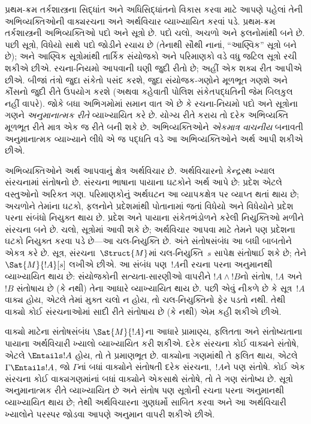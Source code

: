 પ્રથમ-ક્રમ તર્કશાસ્ત્રના સિદ્ધાંત અને
અધિસિદ્ધાંતનો વિકાસ કરવા માટે આપણે
પહેલાં તેની અભિવ્યક્તિઓની વાક્યરચના
અને અર્થવિચાર વ્યાખ્યાયિત કરવાં પડે.
પ્રથમ-ક્રમ તર્કશાસ્ત્રની અભિવ્યક્તિઓ
પદો અને સૂત્રો છે. પદો
ચલો, અચળો અને
ફલનોમાંથી બને છે.
પછી સૂત્રો, વિધેયો
સાથે પદો જોડીને રચાય છે
(તેનાથી સૌથી નાનાં, “આણ્વિક”
સૂત્રો બને છે); અને આણ્વિક
સૂત્રોમાંથી તાર્કિક સંયોજકો
અને પરિમાણકો વડે વધુ જટિલ
સૂત્રો રચી શકીએ છીએ.
રચના-નિયમો આપવાની ઘણી જુદી
રીતો છે; અહીં એક શક્ય
રીત આપીએ છીએ. બીજાં તંત્રો
જુદા સંકેતો પસંદ કરશે,
જુદા સંયોજક-ગણોને મૂળભૂત
ગણશે અને કૌંસનો જુદી
રીતે ઉપયોગ કરશે
(અથવા કહેવાતી પોલિશ
સંકેતપદ્ધતિની જેમ બિલકુલ
નહીં વાપરે). જોકે બધા
અભિગમોમાં સમાન વાત
એ છે કે રચના-નિયમો
પદો અને સૂત્રોના ગણને
\emph{અનુમાનાત્મક રીતે}
વ્યાખ્યાયિત કરે છે.
યોગ્ય રીતે કરાય તો
દરેક અભિવ્યક્તિ મૂળભૂત
રીતે માત્ર એક જ રીતે
બની શકે છે. અભિવ્યક્તિઓને
\emph{એકમાત્ર વાચનીય}
બનાવતી અનુમાનાત્મક
વ્યાખ્યાને લીધે એ જ
પદ્ધતિ વડે આ
અભિવ્યક્તિઓને અર્થ
આપી શકીએ છીએ.

અભિવ્યક્તિઓને અર્થ આપવાનું ક્ષેત્ર
અર્થવિચાર છે. અર્થવિચારનો કેન્દ્રસ્થ
ખ્યાલ સંરચનામાં સંતોષનો છે.
સંરચના ભાષાના પાયાના
ઘટકોને અર્થ આપે છે:
પ્રદેશ એટલે વસ્તુઓનો
અરિક્ત ગણ. પરિમાણકોનું
અર્થઘટન આ વ્યાપકક્ષેત્ર
પર વ્યાપ્ત થતાં થાય છે;
અચળોને તેમાંના ઘટકો,
ફલનોને પ્રદેશમાંથી
પોતાનામાં જતાં વિધેયો અને
વિધેયોને પ્રદેશ
પરના સંબંધો નિયુક્ત થાય છે.
પ્રદેશ અને પાયાના
સંકેતભંડોળને કરેલી નિયુક્તિઓ
મળીને સંરચના બને છે.
ચલો, સૂત્રોમાં
આવી શકે છે; અર્થવિચાર
આપવા માટે તેમને પણ
પ્રદેશના ઘટકો
નિયુક્ત કરવા પડે છે—આ
ચલ-નિયુક્તિ છે. અંતે
સંતોષસંબંધ આ બધી બાબતોને
એકત્ર કરે છે. સૂત્ર,
સંરચના~$\Struct{M}$માં
ચલ-નિયુક્તિ~$s$ સાપેક્ષ
સંતોષાઈ શકે છે; તેને
$\Sat{M}{!A}[s]$ લખીએ છીએ.
આ સંબંધ પણ~$!A$ની
રચના પરના અનુમાનથી
વ્યાખ્યાયિત થાય છે:
સંયોજકોની સત્યતા-સારણીઓ
વાપરીને $!A \land !B$નો
સંતોષ, $!A$ અને~$!B$
સંતોષાય છે (કે નથી)
તેના આધારે વ્યાખ્યાયિત
થાય છે. પછી એવું
નીકળે છે કે
સૂત્ર~$!A$
વાક્ય હોય,
એટલે તેમાં મુક્ત
ચલો ન હોય, તો
ચલ-નિયુક્તિનો ફેર
પડતો નથી. તેથી
વાક્યો કોઈ
સંરચનાઓમાં
સાદી રીતે સંતોષાય
છે (કે નથી) એમ
કહી શકીએ છીએ.

વાક્યો માટેના સંતોષસંબંધ
$\Sat{M}{!A}$ના આધારે
પ્રામાણ્ય, ફલિતતા અને
સંતોષ્યતાના પાયાના
અર્થવિચારી ખ્યાલો
વ્યાખ્યાયિત કરી શકીએ.
દરેક સંરચના કોઈ
વાક્યને સંતોષે,
એટલે $\Entails !A$
હોય, તો તે પ્રમાણભૂત છે.
વાક્યોના ગણમાંથી
તે ફલિત થાય, એટલે
$\Gamma \Entails !A$,
જો $\Gamma$નાં
બધાં વાક્યોને
સંતોષતી દરેક
સંરચના,~$!A$ને
પણ સંતોષે. કોઈ એક
સંરચના કોઈ
વાક્યગણમાંનાં બધાં
વાક્યોને
એકસાથે સંતોષે,
તો તે ગણ સંતોષ્ય છે.
સૂત્રો અનુમાનાત્મક
રીતે વ્યાખ્યાયિત છે
અને સંતોષ પણ
સૂત્રોની રચના
પરના અનુમાનથી
વ્યાખ્યાયિત થાય છે;
તેથી અર્થવિચારના
ગુણધર્મો સાબિત
કરવા અને આ
અર્થવિચારી ખ્યાલોને
પરસ્પર જોડવા આપણે
અનુમાન વાપરી શકીએ છીએ.
\endgroup


